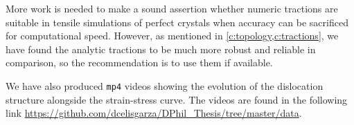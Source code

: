 More work is needed to make a sound assertion whether numeric tractions are suitable in tensile simulations of perfect crystals when accuracy can be sacrificed for computational speed. However, as mentioned in \cref{c:topology,c:tractions}, we have found the analytic tractions to be much more robust and reliable in comparison, so the recommendation is to use them if available.

We have also produced \texttt{mp4} videos showing the evolution of the dislocation structure alongside the strain-stress curve. The videos are found in the following link \href{https://github.com/dcelisgarza/DPhil_Thesis/tree/master/data}{https://github.com/dcelisgarza/DPhil\_Thesis/tree/master/data}.



